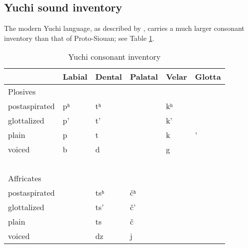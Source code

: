 \documentclass[output=paper]{LSP/langsci}
\begin{document}
\subsection{Yuchi sound inventory}

The modern Yuchi language, as described by \citet{Linn2000}, carries a much larger consonant inventory than that of Proto-Siouan; see Table \ref{yuchiinventory}.

\begin{table}[h!]
\caption{Yuchi consonant inventory} \label{yuchiinventory}
    \begin{tabular}{llllll}\lsptoprule
    ~                           & Labial    &  Dental      &  Palatal        &  Velar      & Glotta  \\
    \midrule
     Plosives            & ~                   & ~                    & ~                       & ~                   & ~                \\
    postaspirated               & pʰ & tʰ  & ~                       & kʰ & ~                \\
    glottalized                 & p'                  & t'                   & ~                       & k'                  & ~                \\
    plain                       & p                   & t                    & ~                       & k                   & '                \\
    voiced                      & b                   & d                    & ~                       & g                   & ~                \\
    ~                           & ~                   & ~                    & ~                       & ~                   & ~                \\
    Affricates        & ~                   & ~                    & ~                       & ~                   & ~                \\
    postaspirated               & ~                   & tsʰ & \v{c}ʰ & ~                   & ~                \\
    glottalized                 & ~                   & ts'                  & \v{c}'                  & ~                   & ~                \\
    plain                       & ~                   & ts                   & \v{c}                   & ~                   & ~                \\
    voiced                      & ~                   & dz                   & j                  & ~                   & ~                \\

\end{tabular}
\end{table}
\end{document}
